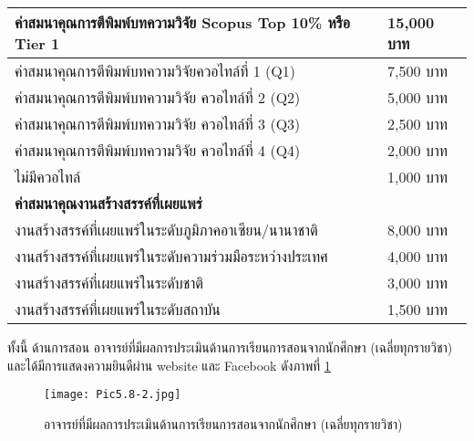 \begin{center}
\begin{longtable}{|p{}|p{}|}
			\hline
			ค่าสมนาคุณการตีพิมพ์บทความวิจัย Scopus Top 10\% หรือ Tier 1	&15,000 บาท\\
			\hline
			ค่าสมนาคุณการตีพิมพ์บทความวิจัยควอไทล์ที่ 1 (Q1)         	&7,500 บาท\\
			\hline
			ค่าสมนาคุณการตีพิมพ์บทความวิจัย ควอไทล์ที่ 2 (Q2)         	&5,000 บาท\\
			\hline
			ค่าสมนาคุณการตีพิมพ์บทความวิจัย ควอไทล์ที่ 3 (Q3)         	&2,500 บาท\\
			\hline
			ค่าสมนาคุณการตีพิมพ์บทความวิจัย ควอไทล์ที่ 4 (Q4)         	&2,000 บาท\\
			\hline
			ไม่มีควอไทล์	&1,000 บาท\\
			\hline
			\multicolumn{2}{|l|}{\textbf{ค่าสมนาคุณงานสร้างสรรค์ที่เผยแพร่}}\\
			\hline
			งานสร้างสรรค์ที่เผยแพร่ในระดับภูมิภาคอาเซียน/นานาชาติ     	&8,000 บาท\\
			\hline
			งานสร้างสรรค์ที่เผยแพร่ในระดับความร่วมมือระหว่างประเทศ  	&4,000 บาท\\
			\hline
			งานสร้างสรรค์ที่เผยแพร่ในระดับชาติ                                	&3,000 บาท\\
			\hline
			งานสร้างสรรค์ที่เผยแพร่ในระดับสถาบัน                            	&1,500 บาท\\
			\hline
	\end{longtable}
\end{center}
ทั้งนี้ ด้านการสอน อาจารย์ที่มีผลการประเมินด้านการเรียนการสอนจากนักศึกษา (เฉลี่ยทุกรายวิชา) และได้มีการแสดงความยินดีผ่าน website และ Facebook ดังภาพที่ \ref{Pic5.8-2}
\begin{figure}[h!]
	\begin{center}
	\texttt{[image: Pic5.8-2.jpg]}
	\caption{อาจารย์ที่มีผลการประเมินด้านการเรียนการสอนจากนักศึกษา (เฉลี่ยทุกรายวิชา)}
	\label{Pic5.8-2}
	\end{center}
\end{figure}
\newpage
\begin{doclist}
\end{doclist}